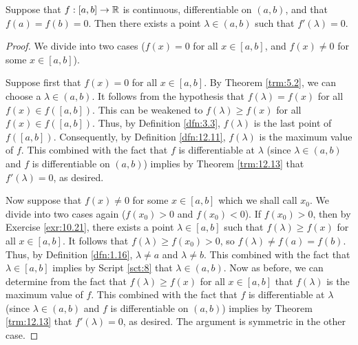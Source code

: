 \documentclass[../main.tex]{subfiles}
\begin{document}
\begin{theorem}\label{trm:12.15}
    Suppose that $f:[a,b]\to\mathbb{R}$ is continuous, differentiable on $(a,b)$, and that $f(a)=f(b)=0$. Then there exists a point $\lambda\in(a,b)$ such that $f'(\lambda)=0$.
    \begin{proof}
        We divide into two cases ($f(x)=0$ for all $x\in[a,b]$, and $f(x)\neq 0$ for some $x\in[a,b]$).\par
        Suppose first that $f(x)=0$ for all $x\in[a,b]$. By Theorem \ref{trm:5.2}, we can choose a $\lambda\in(a,b)$. It follows from the hypothesis that $f(\lambda)=f(x)$ for all $f(x)\in f([a,b])$. This can be weakened to $f(\lambda)\geq f(x)$ for all $f(x)\in f([a,b])$. Thus, by Definition \ref{dfn:3.3}, $f(\lambda)$ is the last point of $f([a,b])$. Consequently, by Definition \ref{dfn:12.11}, $f(\lambda)$ is the maximum value of $f$. This combined with the fact that $f$ is differentiable at $\lambda$ (since $\lambda\in(a,b)$ and $f$ is differentiable on $(a,b)$) implies by Theorem \ref{trm:12.13} that $f'(\lambda)=0$, as desired.\par
        Now suppose that $f(x)\neq 0$ for some $x\in[a,b]$ which we shall call $x_0$. We divide into two cases again ($f(x_0)>0$ and $f(x_0)<0$). If $f(x_0)>0$, then by Exercise \ref{exr:10.21}, there exists a point $\lambda\in[a,b]$ such that $f(\lambda)\geq f(x)$ for all $x\in[a,b]$. It follows that $f(\lambda)\geq f(x_0)>0$, so $f(\lambda)\neq f(a)=f(b)$. Thus, by Definition \ref{dfn:1.16}, $\lambda\neq a$ and $\lambda\neq b$. This combined with the fact that $\lambda\in[a,b]$ implies by Script \ref{sct:8} that $\lambda\in(a,b)$. Now as before, we can determine from the fact that $f(\lambda)\geq f(x)$ for all $x\in[a,b]$ that $f(\lambda)$ is the maximum value of $f$. This combined with the fact that $f$ is differentiable at $\lambda$ (since $\lambda\in(a,b)$ and $f$ is differentiable on $(a,b)$) implies by Theorem \ref{trm:12.13} that $f'(\lambda)=0$, as desired. The argument is symmetric in the other case.
    \end{proof}
\end{theorem}
\end{document}
